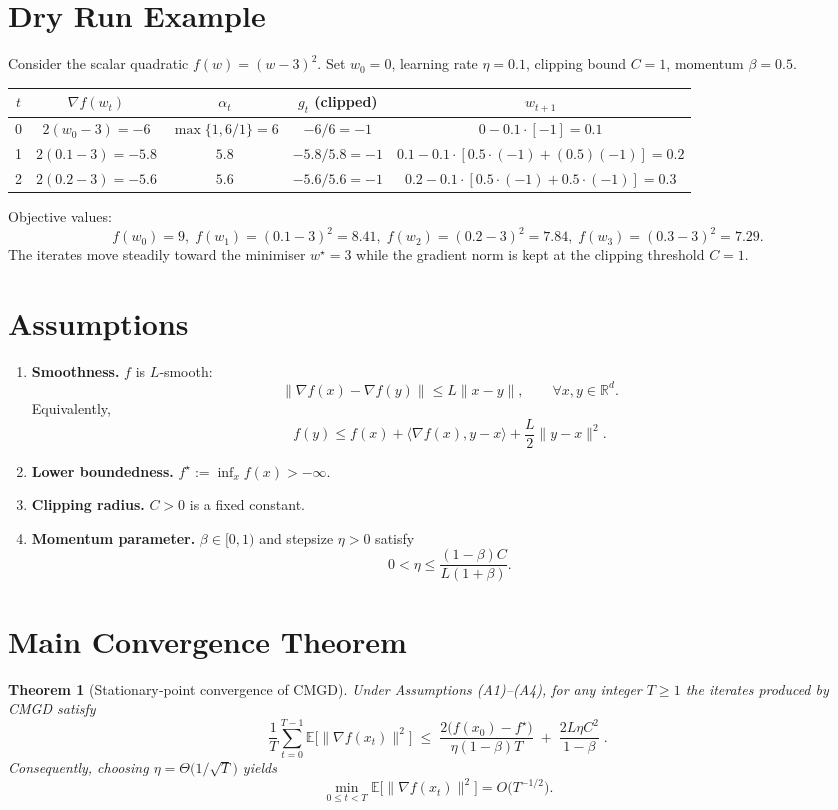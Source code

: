 \documentclass{article}
\newtheorem{theorem}{Theorem}
\begin{document}
\section*{Dry Run Example}
Consider the scalar quadratic $f(w)=(w-3)^2$.  
Set $w_0=0$, learning rate $\eta=0.1$, clipping bound $C=1$, momentum $\beta=0.5$.

\begin{center}
\begin{tabular}{c|c|c|c|c}
$t$ & $\nabla f(w_t)$ & $\alpha_t$ & $g_t$ (clipped) & $w_{t+1}$ \\ \hline
0 & $2(w_0-3)=-6$ & $\max\{1,6/1\}=6$ & $-6/6=-1$ & $0-0.1\cdot[-1]=0.1$ \\
1 & $2(0.1-3)=-5.8$ & $5.8$ & $-5.8/5.8=-1$ & $0.1-0.1\cdot[0.5\cdot(-1)+(0.5)(-1)]=0.2$ \\
2 & $2(0.2-3)=-5.6$ & $5.6$ & $-5.6/5.6=-1$ & $0.2-0.1\cdot[0.5\cdot(-1)+0.5\cdot(-1)]=0.3$ \\
\end{tabular}
\end{center}

Objective values:
\[
f(w_0)=9,\; f(w_1)=(0.1-3)^2=8.41,\; f(w_2)=(0.2-3)^2=7.84,\; f(w_3)=(0.3-3)^2=7.29.
\]
The iterates move steadily toward the minimiser $w^\star=3$ while the gradient norm is kept at the clipping threshold $C=1$.

\section*{Assumptions}
\begin{enumerate}[label=(A\arabic*)]
\item \textbf{Smoothness.} $f$ is $L$‑smooth:
\[
\|\nabla f(x)-\nabla f(y)\|\le L\|x-y\|,\qquad\forall x,y\in\mathbb{R}^d .\tag{A1}
\]
Equivalently,
\[
f(y)\le f(x)+\langle\nabla f(x),y-x\rangle+\frac{L}{2}\|y-x\|^2 .\tag{A1'}
\]

\item \textbf{Lower boundedness.} $\displaystyle f^\star:=\inf_{x}f(x)>-\infty$. 

\item \textbf{Clipping radius.} $C>0$ is a fixed constant. 

\item \textbf{Momentum parameter.} $\beta\in[0,1)$ and stepsize $\eta>0$ satisfy
\[
0<\eta\le\frac{(1-\beta)C}{L(1+\beta)} .\tag{A4}
\]
\end{enumerate}

\section*{Main Convergence Theorem}
\begin{theorem}[Stationary‑point convergence of CMGD]\label{thm:main}
Under Assumptions (A1)–(A4), for any integer $T\ge1$ the iterates produced by CMGD satisfy
\[
\frac{1}{T}\sum_{t=0}^{T-1}\mathbb{E}\bigl[\|\nabla f(x_t)\|^2\bigr]
\;\le\;
\frac{2\bigl(f(x_0)-f^\star\bigr)}{\eta(1-\beta)T}
\;+\;
\frac{2L\eta C^2}{1-\beta}\; .
\]
Consequently, choosing $\eta =\Theta\!\bigl(1/\sqrt{T}\bigr)$ yields
\[
\min_{0\le t<T}\mathbb{E}\bigl[\|\nabla f(x_t)\|^2\bigr]=O\!\bigl(T^{-1/2}\bigr).
\]
\end{theorem}
\end{document}
